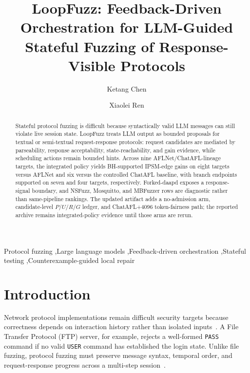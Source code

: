 \documentclass[final,5p,times,number]{elsarticle}
\begin{document}
\begin{frontmatter}

\title{LoopFuzz: Feedback-Driven Orchestration for LLM-Guided Stateful Fuzzing of Response-Visible Protocols}

\author[inst1]{Ketang Chen}
\author[inst1]{Xiaolei Ren}


\begin{abstract}
Stateful protocol fuzzing is difficult because syntactically valid LLM messages can still violate live session state. LoopFuzz treats LLM output as bounded proposals for textual or semi-textual request-response protocols: request candidates are mediated by parseability, response acceptability, state-reachability, and gain evidence, while scheduling actions remain bounded hints. Across nine AFLNet/ChatAFL-lineage targets, the integrated policy yields BH-supported IPSM-edge gains on eight targets versus AFLNet and six versus the controlled ChatAFL baseline, with branch endpoints supported on seven and four targets, respectively. Forked-daapd exposes a response-signal boundary, and NSFuzz, Mosquitto, and MBFuzzer rows are diagnostic rather than same-pipeline rankings. The updated artifact adds a no-admission arm, candidate-level $P/U/R/G$ ledger, and ChatAFL+4096 token-fairness path; the reported archive remains integrated-policy evidence until those arms are rerun.
\end{abstract}

\begin{keyword}
Protocol fuzzing \sep Large language models \sep Feedback-driven orchestration \sep Stateful testing \sep Counterexample-guided local repair
\end{keyword}

\end{frontmatter}
\small

\section{Introduction}
Network protocol implementations remain difficult security targets because correctness depends on interaction history rather than isolated inputs~\cite{aflnet,stateafl,sgf_usenix22,formatted_stateful_greybox_fuzzing_2024,resolverfuzz_query_response_2024}. A File Transfer Protocol (FTP) server, for example, rejects a well-formed \texttt{PASS} command if no valid \texttt{USER} command has established the login state. Unlike file fuzzing, protocol fuzzing must preserve message syntax, temporal order, and request-response progress across a multi-step session~\cite{resolverfuzz_query_response_2024,mbfuzzer_mqtt_2025,bleem_packet_sequence_2023,logos_log_guided_fuzzing_2024,diane_identifying_fuzzing_triggers_2021,corecrisis_context_aware_2025}.
\end{document}
